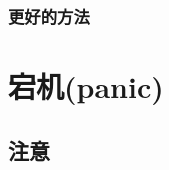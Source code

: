 \hypertarget{ux66f4ux597dux7684ux65b9ux6cd5}{%
\subsubsection{更好的方法}\label{ux66f4ux597dux7684ux65b9ux6cd5}}

\begin{Shaded}
\begin{Highlighting}[]
  \NormalTok{ \{}
\NormalTok{  \}}
\NormalTok{\}}

\NormalTok{) }\NormalTok{ \{}
  \NormalTok{ \{}
\NormalTok{  \}}
\NormalTok{\}}
\end{Highlighting}
\end{Shaded}

\hypertarget{ux5b95ux673apanic}{%
\section{宕机(panic)}\label{ux5b95ux673apanic}}

\hypertarget{ux6ce8ux610f-1}{%
\subsection{注意}\label{ux6ce8ux610f-1}}


